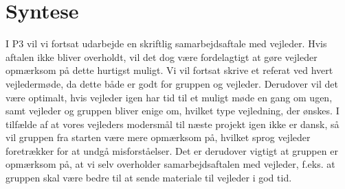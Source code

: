 \section{Syntese}
I P$3$ vil vi fortsat udarbejde en skriftlig samarbejdsaftale med vejleder. Hvis aftalen ikke bliver overholdt, vil det dog være fordelagtigt at gøre vejleder opmærksom på dette hurtigst muligt. Vi vil fortsat skrive et referat ved hvert vejledermøde, da dette både er godt for gruppen og vejleder. Derudover vil det være optimalt, hvis vejleder igen har tid til et muligt møde en gang om ugen, samt vejleder og gruppen bliver enige om, hvilket type vejledning, der ønskes. I tilfælde af at vores vejleders modersmål til næste projekt igen ikke er dansk, så vil gruppen fra starten være mere opmærksom på, hvilket sprog vejleder foretrækker for at undgå misforståelser. Det er derudover vigtigt at gruppen er opmærksom på, at vi selv overholder samarbejdsaftalen med vejleder, f.eks. at gruppen skal være bedre til at sende materiale til vejleder i god tid.